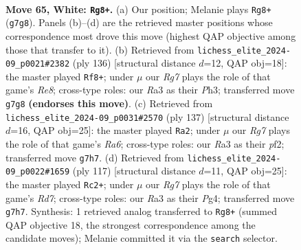 \documentclass[11pt]{article}
\begin{document}
\clearpage

\begin{figure}[p]\centering
\begin{subfigure}{0.46\textwidth}\centering
\resizebox{\linewidth}{!}{%
\newchessgame
\chessboard[
  setfen={2k5/1b4R1/8/8/1P6/R7/1r6/6K1 w - - 3 65},
  showmover=false,
  pgfstyle=straightmove, color=movearrow, markmove={g7-g8}
]}
\caption{}
\end{subfigure}\hfill
\begin{subfigure}{0.46\textwidth}\centering
\resizebox{\linewidth}{!}{%
\newchessgame
\chessboard[
  setfen={4R3/8/8/4b3/5k2/3K3P/6r1/8 w - - 0 69},
  showmover=false,
  pgfstyle=straightmove, color=movearrow, markmove={e8-f8}
]}
\caption{}
\end{subfigure}
\\[4pt]
\begin{subfigure}{0.46\textwidth}\centering
\resizebox{\linewidth}{!}{%
\newchessgame
\chessboard[
  setfen={8/8/3k4/5R2/4K3/r2B1p2/5P2/8 b - - 2 69},
  showmover=false,
  pgfstyle=straightmove, color=movearrow, markmove={a3-a2}
]}
\caption{}
\end{subfigure}\hfill
\begin{subfigure}{0.46\textwidth}\centering
\resizebox{\linewidth}{!}{%
\newchessgame
\chessboard[
  setfen={8/p2B4/2K5/7R/1k4p1/8/3r4/8 b - - 0 59},
  showmover=false,
  pgfstyle=straightmove, color=movearrow, markmove={d2-c2}
]}
\caption{}
\end{subfigure}
\caption{\textbf{Move 65, White: \texttt{Rg8+}.} (a) Our position; Melanie plays \texttt{Rg8+} (\texttt{g7g8}). Panels (b)--(d) are the retrieved master positions whose correspondence most drove this move (highest QAP objective among those that transfer to it). (b) Retrieved from \texttt{lichess\_elite\_2024-09\_p0021\#2382} (ply 136) [structural distance $d$=12, QAP obj=18]: the master played \texttt{Rf8+}; under $\mu$ our \emph{Rg7} plays the role of that game's \emph{Re8}; cross-type roles: our \emph{R}a3 as their \emph{P}h3; transferred move \texttt{g7g8} \textbf{(endorses this move)}. (c) Retrieved from \texttt{lichess\_elite\_2024-09\_p0031\#2570} (ply 137) [structural distance $d$=16, QAP obj=25]: the master played \texttt{Ra2}; under $\mu$ our \emph{Rg7} plays the role of that game's \emph{Ra6}; cross-type roles: our \emph{R}a3 as their \emph{p}f2; transferred move \texttt{g7h7}. (d) Retrieved from \texttt{lichess\_elite\_2024-09\_p0022\#1659} (ply 117) [structural distance $d$=11, QAP obj=25]: the master played \texttt{Rc2+}; under $\mu$ our \emph{Rg7} plays the role of that game's \emph{Rd7}; cross-type roles: our \emph{R}a3 as their \emph{P}g4; transferred move \texttt{g7h7}. Synthesis: 1 retrieved analog transferred to \texttt{Rg8+} (summed QAP objective 18, the strongest correspondence among the candidate moves); Melanie committed it via the \texttt{search} selector.}
\label{fig:thought-m128}
\end{figure}
\end{document}
